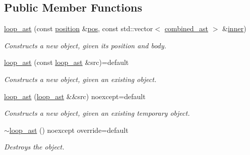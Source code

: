 \subsection*{Public Member Functions}
\begin{DoxyCompactItemize}
\item 
\hypertarget{classbfjit_1_1loop__ast_ad30dcb55d7c06077ee2dafb1a378c5e7}{}\label{classbfjit_1_1loop__ast_ad30dcb55d7c06077ee2dafb1a378c5e7} 
\hyperlink{classbfjit_1_1loop__ast_ad30dcb55d7c06077ee2dafb1a378c5e7}{loop\+\_\+ast} (const \hyperlink{classbfjit_1_1position}{position} \&\hyperlink{classbfjit_1_1ast_a748b75683a33e11ad87b907ba0118c3d}{pos}, const std\+::vector$<$ \hyperlink{namespacebfjit_ad9bbdb76861e57928b1bc7695c2c0623}{combined\+\_\+ast} $>$ \&\hyperlink{classbfjit_1_1loop__ast_ad1418cddc65f555771317745baa12ca3}{inner})
\begin{DoxyCompactList}\small\item\em Constructs a new object, given its position and body. \end{DoxyCompactList}\item 
\hypertarget{classbfjit_1_1loop__ast_a755299be080720eb34d97cbd6f6d490f}{}\label{classbfjit_1_1loop__ast_a755299be080720eb34d97cbd6f6d490f} 
\hyperlink{classbfjit_1_1loop__ast_a755299be080720eb34d97cbd6f6d490f}{loop\+\_\+ast} (const \hyperlink{classbfjit_1_1loop__ast}{loop\+\_\+ast} \&src)=default
\begin{DoxyCompactList}\small\item\em Constructs a new object, given an existing object. \end{DoxyCompactList}\item 
\hypertarget{classbfjit_1_1loop__ast_a6d317229408e8ce7b77a779854228643}{}\label{classbfjit_1_1loop__ast_a6d317229408e8ce7b77a779854228643} 
\hyperlink{classbfjit_1_1loop__ast_a6d317229408e8ce7b77a779854228643}{loop\+\_\+ast} (\hyperlink{classbfjit_1_1loop__ast}{loop\+\_\+ast} \&\&src) noexcept=default
\begin{DoxyCompactList}\small\item\em Constructs a new object, given an existing temporary object. \end{DoxyCompactList}\item 
\hypertarget{classbfjit_1_1loop__ast_aae5b7064e86488f937b255307bd7d5d3}{}\label{classbfjit_1_1loop__ast_aae5b7064e86488f937b255307bd7d5d3} 
\hyperlink{classbfjit_1_1loop__ast_aae5b7064e86488f937b255307bd7d5d3}{$\sim$loop\+\_\+ast} () noexcept override=default
\begin{DoxyCompactList}\small\item\em Destroys the object. \end{DoxyCompactList}\item 

\end{DoxyCompactItemize}
